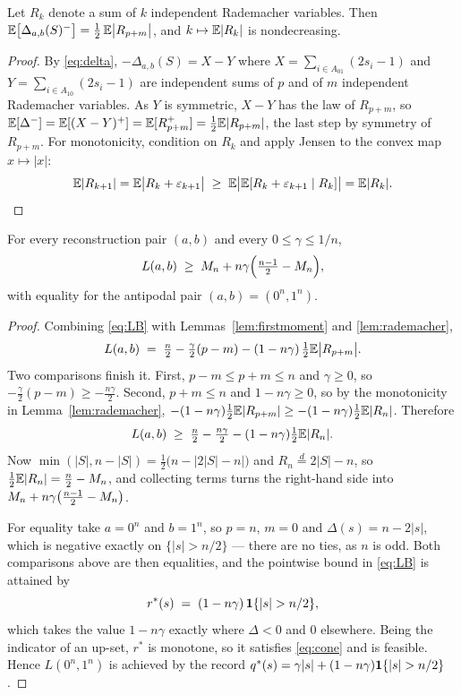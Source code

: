 \begin{lemma}
\label{lem:rademacher}
Let $R_k$ denote a sum of $k$ independent Rademacher variables. Then
$\mathbb{E}\bigl[\Delta_{a,b}(S)^-\bigr] = \tfrac12\,\mathbb{E}\bigl|R_{p+m}\bigr|$, and
$k \mapsto \mathbb{E}|R_k|$ is nondecreasing.
\end{lemma}

\begin{proof}
By \eqref{eq:delta}, $-\Delta_{a,b}(S) = X - Y$ where
$X = \sum_{i \in A_{01}}(2s_i - 1)$ and $Y = \sum_{i \in A_{10}}(2s_i - 1)$ are
independent sums of $p$ and of $m$ independent Rademacher variables. As $Y$ is
symmetric, $X - Y$ has the law of $R_{p+m}$, so
$\mathbb{E}[\Delta^-] = \mathbb{E}[(X-Y)^+] = \mathbb{E}[R_{p+m}^+] = \tfrac12\mathbb{E}|R_{p+m}|$, the last step
by symmetry of $R_{p+m}$. For monotonicity, condition on $R_k$ and apply Jensen
to the convex map $x \mapsto |x|$:
\[
  \mathbb{E}|R_{k+1}| = \mathbb{E}\bigl|R_k + \varepsilon_{k+1}\bigr|
  \;\ge\; \mathbb{E}\bigl|\mathbb{E}[R_k + \varepsilon_{k+1} \mid R_k]\bigr| = \mathbb{E}|R_k| . \qedhere
\]
\end{proof}

\begin{proposition}
\label{prop:antipodal}
For every reconstruction pair $(a,b)$ and every $0 \le \gamma \le 1/n$,
\[
  L(a,b) \;\ge\; M_n + n\gamma\Bigl(\tfrac{n-1}{2} - M_n\Bigr),
\]
with equality for the antipodal pair $(a,b) = (0^n, 1^n)$.
\end{proposition}

\begin{proof}
Combining \eqref{eq:LB} with Lemmas~\ref{lem:firstmoment} and
\ref{lem:rademacher},
\[
  L(a,b) \;=\; \tfrac{n}{2} - \tfrac{\gamma}{2}(p-m)
  - (1-n\gamma)\,\tfrac12\mathbb{E}\bigl|R_{p+m}\bigr| .
\]
Two comparisons finish it. First, $p - m \le p + m \le n$ and $\gamma \ge 0$, so
$-\tfrac{\gamma}{2}(p-m) \ge -\tfrac{n\gamma}{2}$. Second, $p+m \le n$ and
$1 - n\gamma \ge 0$, so by the monotonicity in Lemma~\ref{lem:rademacher},
$-(1-n\gamma)\tfrac12\mathbb{E}|R_{p+m}| \ge -(1-n\gamma)\tfrac12\mathbb{E}|R_n|$. Therefore
\[
  L(a,b) \;\ge\; \tfrac{n}{2} - \tfrac{n\gamma}{2}
              - (1-n\gamma)\tfrac12\mathbb{E}|R_n| .
\]
Now $\min(|S|, n-|S|) = \tfrac12\bigl(n - \bigl|2|S|-n\bigr|\bigr)$ and
$R_n \overset{d}{=} 2|S| - n$, so $\tfrac12\mathbb{E}|R_n| = \tfrac{n}{2} - M_n$, and
collecting terms turns the right-hand side into
$M_n + n\gamma\bigl(\tfrac{n-1}{2} - M_n\bigr)$.

For equality take $a = 0^n$ and $b = 1^n$, so $p = n$, $m = 0$ and
$\Delta(s) = n - 2|s|$, which is negative exactly on $\{|s| > n/2\}$ --- there
are no ties, as $n$ is odd. Both comparisons above are then equalities, and the
pointwise bound in \eqref{eq:LB} is attained by
\[
  r^\ast(s) \;=\; (1-n\gamma)\,\mathbf{1}\{|s| > n/2\},
\]
which takes the value $1-n\gamma$ exactly where $\Delta < 0$ and $0$ elsewhere.
Being the indicator of an up-set, $r^\ast$ is monotone, so it satisfies
\eqref{eq:cone} and is feasible. Hence $L(0^n,1^n)$ is achieved by the record
$\enc^\ast(s) = \gamma|s| + (1-n\gamma)\ind{|s|>n/2}$.
\end{proof}

